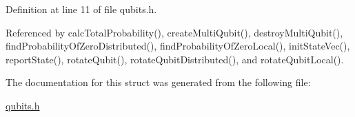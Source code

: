 Definition at line 11 of file qubits.h.

Referenced by calcTotalProbability(), createMultiQubit(), destroyMultiQubit(), findProbabilityOfZeroDistributed(), findProbabilityOfZeroLocal(), initStateVec(), reportState(), rotateQubit(), rotateQubitDistributed(), and rotateQubitLocal().

The documentation for this struct was generated from the following file:\begin{DoxyCompactItemize}
\item 
\hyperlink{qubits_8h}{qubits.h}\end{DoxyCompactItemize}
